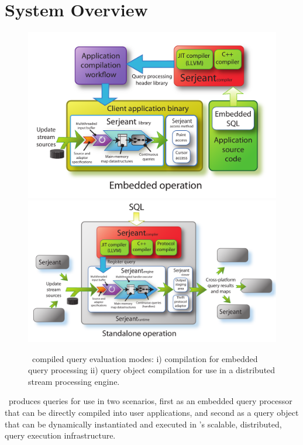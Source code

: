 \section{System Overview}

\begin{figure}[htbp]
\begin{center}
\includegraphics[scale=0.39]{figures/dbt-arch-embedded}
\includegraphics[scale=0.39]{figures/dbt-arch-standalone}
\end{center}
\caption{\compiler\ compiled query evaluation modes: i) compilation for embedded
  query processing ii) query object compilation for use in a distributed stream
  processing engine.}
\label{fig:overview}
\end{figure}

\compiler\ produces queries for use in two scenarios, first as an embedded query
processor that can be directly compiled into user applications, and second as a
query object that can be dynamically instantiated and executed in \compiler's
scalable, distributed, query execution infrastructure.

